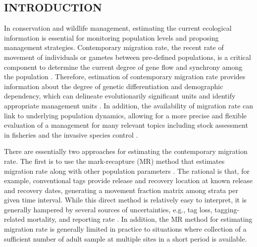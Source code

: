 \documentclass[12pt, English]{article}
\begin{document}
\pagebreak
\begin{spacing}{1.9}
\newcommand{\NeNbias}{S1}

\newcommand{\Nebias}{S2}

\newcommand{\Ninvbias}{S3}

\newcommand{\NeNcv}{S4}

\newcommand{\Necv}{S5}

\newcommand{\Ninvcv}{S6}

\section{INTRODUCTION}


In conservation and wildlife management, estimating the current ecological information is essential for monitoring population levels and proposing management strategies. Contemporary migration rate, the recent rate of movement of individuals or gametes between pre-defined populations, is a critical component to determine the current degree of gene flow and synchrony among the population \cite[]{Waples_2006_MolEcol, https://doi.org/10.1111/j.1365-294X.2010.04688.x}. Therefore, estimation of contemporary migration rate provides information about the degree of genetic differentiation and demographic dependency, which can delineate evolutionarily significant units and identify appropriate management units \cite[]{moritz1994defining, PALSBOLL200711}. In addition, the availability of migration rate can link to underlying population dynamics, allowing for a more precise and flexible evaluation of a management for many relevant topics including stock assessment in fisheries \cite[]{methot2013stock} and the invasive species control \cite[]{doi:10.1146/annurev.ecolsys.32.081501.114037}. 


There are essentially two approaches for estimating the contemporary migration rate. The first is to use the mark-recapture (MR) method that estimates migration rate along with other population parameters \cite[]{kery2011bayesian, Thorson_2021}. The rational is that, for example, conventional tags provide release and recovery location at known release and recovery dates, generating a movement fraction matrix among strata per given time interval. While this direct method is relatively easy to interpret, it is generally hampered by several sources of uncertainties, e.g., tag loss, tagging-related mortality, and reporting rate \cite[]{hilborn2013quantitative}. In addition, the MR method for estimating migration rate is generally limited in practice to situations where collection of a sufficient number of adult sample at multiple sites in a short period is available. 


\end{spacing}
\end{document}
